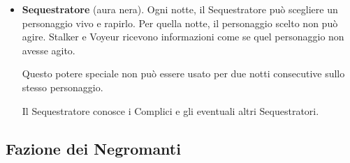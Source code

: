 \documentclass[a4paper,10pt]{article}
\begin{document}
\begin{itemize}
 \item {\bf Sequestratore} (aura nera). Ogni notte, il Sequestratore può scegliere un personaggio vivo e rapirlo. Per quella notte, il personaggio scelto non può agire.
 Stalker e Voyeur ricevono informazioni come se quel personaggio non avesse agito.
 
 Questo potere speciale non può essere usato per due notti consecutive sullo stesso personaggio.
 
 Il Sequestratore conosce i Complici e gli eventuali altri Sequestratori.


\end{itemize}

\subsection*{Fazione dei Negromanti}
\end{document}
